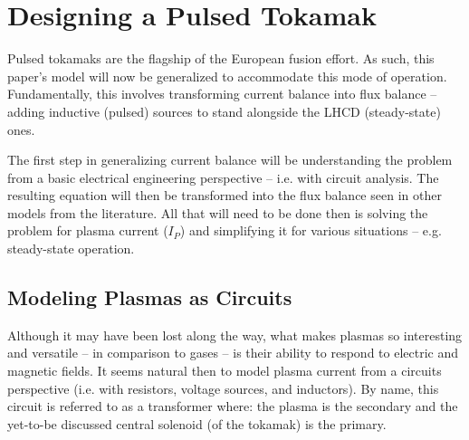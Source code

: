 %
%
%
%
%
%
%
%

\chapter{Designing a Pulsed Tokamak}

\label{chapter:pulsed}

Pulsed tokamaks are the flagship of the European fusion  effort. As such, this paper's model will now be generalized to accommodate this mode of operation. Fundamentally, this involves transforming current balance into flux balance -- adding inductive (pulsed) sources to stand alongside the LHCD (steady-state) ones.

The first step in generalizing current balance will be understanding the problem from a basic electrical engineering perspective -- i.e. with circuit analysis. The resulting equation will then be transformed into the flux balance seen in other models from the literature. All that will need to be done then is solving the problem for plasma current ($I_P$) and simplifying it for various situations -- e.g. steady-state operation.


\section{Modeling Plasmas as Circuits}

Although it may have been lost along the way, what makes plasmas so interesting and versatile -- in comparison to gases -- is their ability to respond to electric and magnetic fields. It seems natural then to model plasma current from a circuits perspective (i.e. with resistors, voltage sources, and inductors). By name, this circuit is referred to as a transformer where: the plasma is the secondary and the yet-to-be discussed central solenoid (of the tokamak) is the primary.


